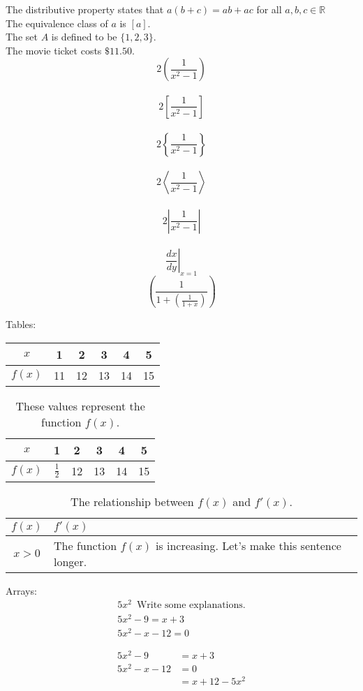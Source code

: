 \documentclass[12pt]{article}
\begin{document}
The distributive property states that $a(b+c)=ab+ac$ for all $a, b, c \in \mathbb{R}$\\[6pt]
The equivalence class of $a$ is $[a]$.\\[6pt]
The set $A$ is defined to be $\{1, 2, 3\}$.\\[6pt]
The movie ticket costs $\$11.50$.\\[6pt]
$$2 \left(\frac{1}{x^2-1}\right)$$\\[6pt]
$$2 \left[\frac{1}{x^2-1}\right]$$\\[6pt]
$$2 \left\{\frac{1}{x^2-1}\right\}$$\\[6pt]
$$2 \left \langle\frac{1}{x^2-1}\right \rangle$$\\[6pt]
$$2 \left|\frac{1}{x^2-1}\right|$$\\[6pt]
$$\left.\frac{dx}{dy}\right|_{x=1}$$
$$\left(\frac{1}{1+\left(\frac{1}{1+x}\right)}\right)$$

Tables:\\

\begin{tabular}{|c|c|c|c|c|c|}
\hline
$x$&1&2&3&4&5\\\hline
$f(x)$&11&12&13&14&15\\\hline
\end{tabular}

\begin{table}[H]
\centering
\def\arraystretch{1.5}
\begin{tabular}{|c|c|c|c|c|c|}
\hline
$x$&1&2&3&4&5\\\hline
$f(x)$&$\frac{1}{2}$&12&13&14&15\\\hline
\end{tabular}
\caption{These values represent the function $f(x)$.}
\end{table}

\begin{table}[H]%
\centering
\caption{The relationship between $f(x)$ and $f'(x)$.}
\def\arraystretch{1.5}%
\begin{tabular}{|c|p{3in}|}
\hline
$f(x)$&$f'(x)$\\\hline
$x>0$&The function $f(x)$ is increasing. Let's make this sentence longer.\\\hline
\end{tabular}
\end{table}

Arrays:
\begin{align}%
5x^2\,  \text{  Write some explanations.}\\
5x^2-9=x+3\\
5x^2-x-12=0
\end{align}

\begin{align*}%
5x^2-9&=x+3\\
5x^2-x-12&=0\\
&=x+12-5x^2
\end{align*}
\end{document}
